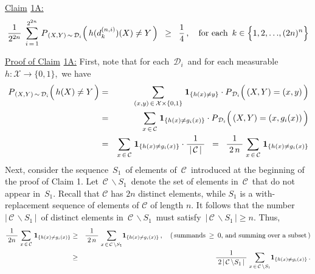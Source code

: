 \vskip 0.5cm
\begin{center}
\begin{minipage}{6.5in}
\noindent
\underline{Claim${\color{white}\textnormal{j}}$1A:}
\begin{equation*}
\dfrac{1}{2^{2n}}\;\,
\overset{2^{2n}}{\underset{i\,=\,1}{\sum}}\;
P_{\,(X,Y)\,\sim\,\mathcal{D}_{i}}\!\left(\,h(d^{(n,i)}_{k})(X) \overset{{\color{white}.}}{\neq} Y\,\right)
\;\; \geq \;\;
	\dfrac{1}{4}\,,
\quad
\textnormal{for each \,$k \in \left\{1,2,\overset{{\color{white}\vert}}{\ldots},(2n)^{n}\right\}$}
\end{equation*}
\end{minipage}
\end{center}
\vskip 0.1cm
\underline{Proof of Claim${\color{white}\textnormal{j}}$1A:}
\vskip 0.2cm
\noindent
First, note that for each \,$\mathcal{D}_{i}$\, and
for each measurable \,$h : \mathcal{X} \longrightarrow \{0,1\}$,\, we have
\begin{eqnarray*}
P_{\,(X,Y)\,\sim\,\mathcal{D}_{i}}\!\left(\,h(X) \overset{{\color{white}.}}{\neq} Y\,\right)
& = &
	\underset{(x,y)\,\in\,\mathcal{X}\times\{0,1\}}{\sum}\; \mathbf{1}_{\{h(x) \neq y\}}
	\cdot P_{\,\mathcal{D}_{i}}\!\left(\,(X,Y)\overset{{\color{white}-}}{=}(x,y)\,\right)
\\
&= &
	\underset{x\,\in\,\mathcal{C}}{\sum}\; \mathbf{1}_{\{h(x) \neq g_{i}(x)\}}
	\cdot P_{\,\mathcal{D}_{i}}\!\left(\,(X,Y)\overset{{\color{white}-}}{=}(x,g_{i}(x))\,\right)
\\
&= &
	\underset{x\,\in\,\mathcal{C}}{\sum}\; \mathbf{1}_{\{h(x) \neq g_{i}(x)\}}
	\cdot \dfrac{1}{{\color{white}.}\vert\,\mathcal{C}\,\vert{\color{white}.}}
	\;\; = \;\;
	\dfrac{1}{{\color{white}.}2\,n{\color{white}.}}\;
	\underset{x\,\in\,\mathcal{C}}{\sum}\; \mathbf{1}_{\{h(x) \neq g_{i}(x)\}}
\end{eqnarray*}
Next, consider the sequence \,$S_{1}$\, of elements of \,$\mathcal{C}$\, introduced
at the beginning of the proof of Claim 1.
Let \,$\mathcal{C}\,\backslash S_{1}$\, denote the set of elements in \,$\mathcal{C}$\,
that do not appear in \,$S_{1}$. Recall that $\mathcal{C}$ has $2n$ distinct elements,
while $S_{1}$ is a with-replacement sequence of elements of $\mathcal{C}$ of length
$n$. It follows that the number \,$\vert\,\mathcal{C}\,\backslash S_{1}\,\vert$\,
of distinct elements in \,$\mathcal{C}\,\backslash S_{1}$\, must satisfy
\,$\vert\,\mathcal{C}\,\backslash S_{1}\,\vert \geq n$.
Thus,
\begin{eqnarray*}
\dfrac{1}{{\color{white}.}2n{\color{white}.}}\;
\underset{x\,\in\,\mathcal{C}}{\sum}\; \mathbf{1}_{\{h(x) \neq g_{i}(x)\}}
& \geq &
	\dfrac{1}{{\color{white}.}2\,n{\color{white}.}}\;
	\underset{x\,\in\,\mathcal{C}\,\backslash S_{1}}{\sum} \mathbf{1}_{\{h(x) \neq g_{i}(x)\}}\,,
	\quad
	\textnormal{(\,summands \,$\geq$\, $0$, and summing over a subset\,)}
\\
& \geq &
	\dfrac{1}{{\color{white}.}2\,\vert\,\mathcal{C}\,\backslash S_{1}\,\vert{\color{white}.}}\;
	\underset{x\,\in\,\mathcal{C}\,\backslash S_{1}}{\sum} \mathbf{1}_{\{h(x) \neq g_{i}(x)\}}\,.
\end{eqnarray*}
